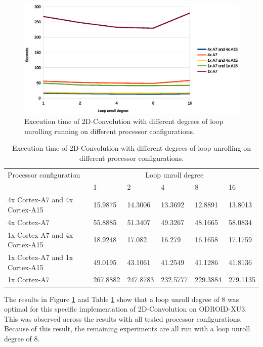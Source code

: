 \begin{figure}[H]
  \centering
  \includegraphics[width=160mm]{fig/loop-unroll-execution-time.eps}
  \caption{Execution time of 2D-Convolution with different degrees of loop unrolling running on different processor configurations. \label{unrollgraph}}
\end{figure}
\begin{table}[H]
  \begin{tabular}{llllll}
    \toprule
    Processor configuration           & \multicolumn{5}{c}{Loop unroll degree} \\
                                      & 1                   & 2         & 4         & 8         & 16 \\
    \midrule
    4x Cortex-A7 and 4x Cortex-A15    & 15.9875             & 14.3006   & 13.3692   & 12.8891   & 13.8013 \\
    4x Cortex-A7                      & 55.8885             & 51.3407   & 49.3267   & 48.1665   & 58.0834 \\
    1x Cortex-A7 and 4x Cortex-A15    & 18.9248             & 17.082    & 16.279    & 16.1658   & 17.1759 \\
    1x Cortex-A7 and 1x Cortex-A15    & 49.0195             & 43.1061   & 41.2549   & 41.1286   & 41.8136 \\
    1x Cortex-A7                      & 267.8882            & 247.8783  & 232.5777  & 229.3884  & 279.1135 \\
    \bottomrule
  \end{tabular}
  \caption{Execution time of 2D-Convolution with different degrees of loop unrolling on different processor configurations. \label{unrolltable}}
\end{table}

The results in Figure \ref{unrollgraph} and Table \ref{unrolltable} show that a loop unroll degree of 8 was optimal for this specific implementation of 2D-Convolution on ODROID-XU3.
This was observed across the results with all tested processor configurations.
Because of this result, the remaining experiments are all run with a loop unroll degree of 8.

